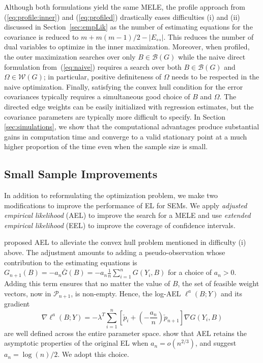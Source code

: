 \documentclass[notitlepage]{article}
\begin{document}
Although both formulations yield the same MELE, the profile approach
from (\ref{eq:profile:inner}) and (\ref{eq:profiled}) drastically
eases difficulties (i) and (ii) discussed in
Section~\ref{sec:empLik} as the number of estimating equations for the
covariance is reduced to $m + m(m - 1)/2 - |E_\leftrightarrow|$.  This
reduces the number of dual variables to optimize in the inner
maximization.  Moreover, when profiled, the outer maximization
searches over only $B\in\mathcal{B}(G)$ while the naive direct
formulation from~(\ref{eq:naive}) requires a search over both
$B\in\mathcal{B}(G)$ and $\Omega\in\mathcal{W}(G)$; in particular,
positive definiteness of $\Omega$ needs to be respected in the naive
optimization.  Finally, satisfying the convex hull condition for the
error covariances typically requires a simultaneous good choice of $B$
and $\Omega$. The directed edge weights can be easily initialized with
regression estimates, but the covariance parameters are typically more
difficult to specify.  In Section \ref{sec:simulations}, we show that
the computational advantages produce substantial gains in computation
time and converge to a valid stationary point at a much higher
proportion of the time even when the sample size is small.

\subsection{Small Sample Improvements}
\label{sec:small-sample-impr}

In addition to reformulating the optimization problem, we make two
modifications to improve the performance of EL for SEMs.  We apply
\emph{adjusted empirical likelihood} (AEL) to improve the search for a MELE
and use \emph{extended empirical likelihood} (EEL) to improve the coverage of
confidence intervals.

\citet{chen2008adjusted} proposed AEL to alleviate the convex hull
problem mentioned in difficulty (i) above.  The adjustment amounts
to adding a pseudo-observation whose contribution to the estimating
equations is
$G_{n+1}(B) = -a_n \bar G(B) = -a_n \frac{1}{n}\sum_{i=1}^n G(Y_i, B)$
for a choice of $a_n>0$.  Adding this term ensures that no matter the
value of $B$, the set of feasible weight vectors, now in $\mathcal{P}_{n+1}$, is
non-empty.  Hence, the log-AEL $\ell^a(B; Y)$ and its gradient
\begin{equation}
  \nabla \ell^a(B; Y) = - \lambda^T\sum_{i=1}^n \left[\check p_i +\left(-\frac{a_n}{n}\right)\check p_{n+1} \right] \nabla G(Y_i, B)
\end{equation}
are
well defined across the entire parameter space.
\citet{chen2008adjusted} show that AEL retains the asymptotic
properties of the original EL when $a_n = o(n^{2/3})$, and suggest
$a_n = \log(n) / 2$.  We adopt this choice.
\end{document}
